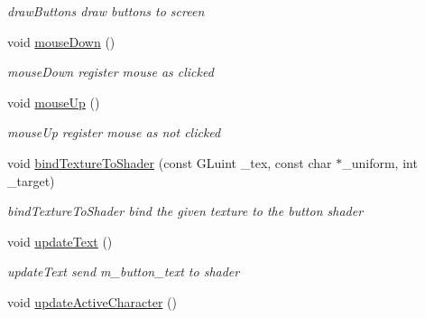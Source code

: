 \begin{DoxyCompactItemize}
\begin{DoxyCompactList}\small\item\em draw\+Buttons draw buttons to screen \end{DoxyCompactList}\item 
\hypertarget{class_gui_ada706cacea65e2005bbf49db7ebc9258}{}void \hyperlink{class_gui_ada706cacea65e2005bbf49db7ebc9258}{mouse\+Down} ()\label{class_gui_ada706cacea65e2005bbf49db7ebc9258}

\begin{DoxyCompactList}\small\item\em mouse\+Down register mouse as clicked \end{DoxyCompactList}\item 
\hypertarget{class_gui_a47afc0cd87f5b64b4eae9aebfb619eea}{}void \hyperlink{class_gui_a47afc0cd87f5b64b4eae9aebfb619eea}{mouse\+Up} ()\label{class_gui_a47afc0cd87f5b64b4eae9aebfb619eea}

\begin{DoxyCompactList}\small\item\em mouse\+Up register mouse as not clicked \end{DoxyCompactList}\item 
void \hyperlink{class_gui_a788432634f4333cd6f9d1579565a0250}{bind\+Texture\+To\+Shader} (const G\+Luint \+\_\+tex, const char $\ast$\+\_\+uniform, int \+\_\+target)
\begin{DoxyCompactList}\small\item\em bind\+Texture\+To\+Shader bind the given texture to the button shader \end{DoxyCompactList}\item 
\hypertarget{class_gui_a538696f7ef301fda882c525842634ac5}{}void \hyperlink{class_gui_a538696f7ef301fda882c525842634ac5}{update\+Text} ()\label{class_gui_a538696f7ef301fda882c525842634ac5}

\begin{DoxyCompactList}\small\item\em update\+Text send m\+\_\+button\+\_\+text to shader \end{DoxyCompactList}\item 
\hypertarget{class_gui_a32cd15ef494701303d853af6a9ab0020}{}void \hyperlink{class_gui_a32cd15ef494701303d853af6a9ab0020}{update\+Active\+Character} ()\label{class_gui_a32cd15ef494701303d853af6a9ab0020}


\end{DoxyCompactItemize}
